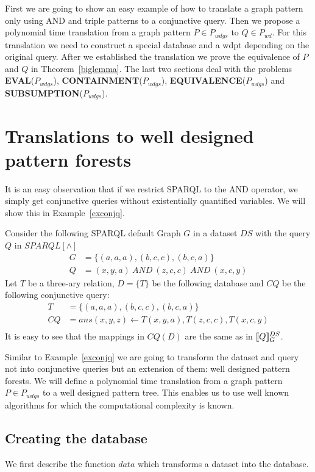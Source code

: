 First we are going to show an easy example of how to translate a graph pattern
only using AND and triple patterns to a conjunctive query. Then we propose a
polynomial time translation from a graph pattern $P \in P_{wdgs}$ to $Q \in P_{wd}$. For this
translation we need to construct a special database and a wdpt depending on the
original query. After we established the translation we prove the equivalence of $P$ and $Q$ in
Theorem~\ref{biglemma}. The last two sections deal with the problems
\textbf{EVAL}($P_{wdgs}$), \textbf{CONTAINMENT}($P_{wdgs}$),
\textbf{EQUIVALENCE}($P_{wdgs}$) and \textbf{SUBSUMPTION}($P_{wdgs}$).

\section{Translations to well designed pattern forests}
It is an easy observation that if we restrict SPARQL to the AND operator, we
simply get conjunctive queries without existentially quantified variables.
We will show this in Example~\ref{exconjq}. 
\begin{example}\label{exconjq}
	Consider the following SPARQL default Graph $G$ in a dataset $DS$ with the query $Q$ in $SPARQL[\land]$
	\begin{align*}
		G &=\{ (a,a,a), (b,c,c), (b,c,a)  \}\\
		Q &= (x,y,a) \ AND \ (z,c,c) \ AND \ (x,c,y)
	\end{align*}
	Let $T$ be a three-ary relation, $D = \{ T \}$ be the following database and
	$CQ$ be the following 
	conjunctive query: 
	\begin{align*}
		T &= \{ (a,a,a), (b,c,c), (b,c,a)\}\\
		CQ &= ans(x,y,z) \leftarrow T(x,y,a), T(z,c,c), T(x,c,y)\\
	\end{align*}
	It is easy to see that the mappings in $CQ(D)$ are the same as in $\llbracket Q
	\rrbracket_G^{DS}$.
\end{example}
Similar to Example~\ref{exconjq} we are going to transform the dataset and query 
not into conjunctive queries but an extension of them: well designed pattern forests. We 
will define a polynomial time translation from a graph pattern $P \in P_{wdgs}$
to a well designed pattern tree. This enables us to use well known algorithms 
for which the computational complexity is known. 

\subsection{Creating the database}
We first describe the function $data$ which transforms a dataset into the
database.

